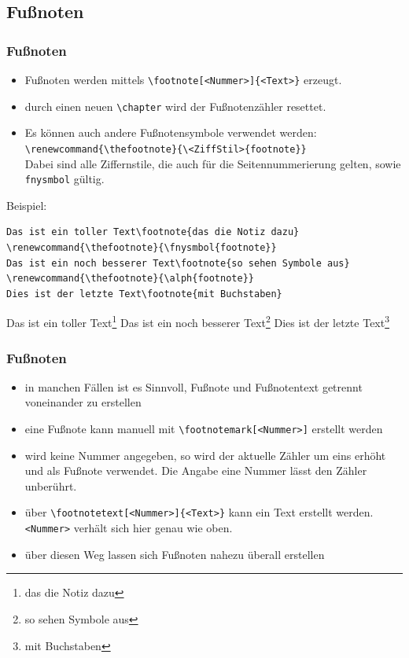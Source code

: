 \subsection{Fußnoten}

\begin{frame}[fragile]
\frametitle{Fußnoten}
\begin{itemize}[<+->]
  \item Fußnoten werden mittels \lstinline[style=Latex]+\footnote[<Nummer>]{<Text>}+ erzeugt.
  \item durch einen neuen \lstinline[style=Latex]+\chapter+ wird der Fußnotenzähler resettet.
  \item Es können auch andere Fußnotensymbole verwendet werden:
   \lstinline[style=Latex]+\renewcommand{\thefootnote}{\<ZiffStil>{footnote}}+ \\
   Dabei sind alle Ziffernstile, die auch für die Seitennummerierung gelten, sowie \texttt{fnysmbol} gültig.
\end{itemize}\pause
Beispiel:
\begin{lstlisting}[style=Latex]
Das ist ein toller Text\footnote{das die Notiz dazu}
\renewcommand{\thefootnote}{\fnysmbol{footnote}}
Das ist ein noch besserer Text\footnote{so sehen Symbole aus}
\renewcommand{\thefootnote}{\alph{footnote}}
Dies ist der letzte Text\footnote{mit Buchstaben}
\end{lstlisting}
Das ist ein toller Text\footnote{das die Notiz dazu}
\renewcommand{\thefootnote}{\fnsymbol{footnote}}
Das ist ein noch besserer Text\footnote{so sehen Symbole aus}
\renewcommand{\thefootnote}{\alph{footnote}}
Dies ist der letzte Text\footnote{mit Buchstaben}
\end{frame}

\begin{frame}[fragile]
\frametitle{Fußnoten}
\begin{itemize}[<+->]
  \item in manchen Fällen ist es Sinnvoll, Fußnote und Fußnotentext getrennt voneinander zu erstellen
  \item eine Fußnote kann manuell mit \lstinline[style=Latex]+\footnotemark[<Nummer>]+ erstellt werden
  \item wird keine Nummer angegeben, so wird der aktuelle Zähler um eins erhöht und als Fußnote verwendet. Die Angabe eine Nummer lässt den Zähler unberührt.
  \item über \lstinline[style=Latex]+\footnotetext[<Nummer>]{<Text>}+ kann ein Text erstellt werden. \texttt{<Nummer>} verhält sich hier genau wie oben.
  \item über diesen Weg lassen sich Fußnoten nahezu überall erstellen
\end{itemize}
\end{frame}

